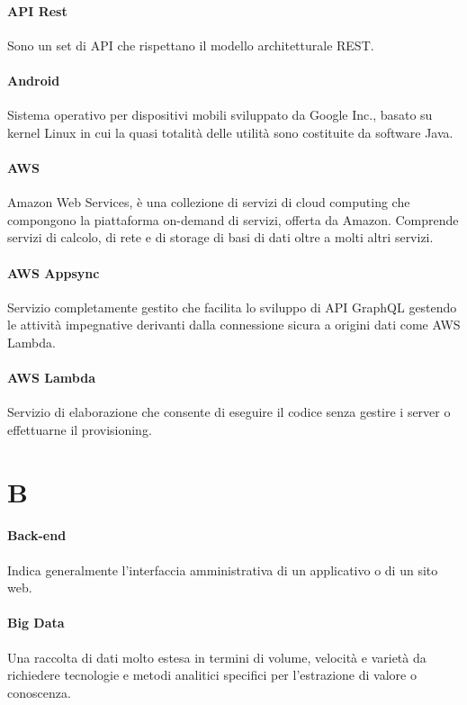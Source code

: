 \documentclass[]{article}
\begin{document}
	\paragraph*{API Rest}
	Sono un set di API che rispettano il modello architetturale REST.
	
	\paragraph*{Android}
	Sistema operativo per dispositivi mobili sviluppato da Google Inc., basato su kernel Linux in cui la quasi totalità delle utilità sono costituite da software Java.
		
	\paragraph*{AWS}
	Amazon Web Services, è una collezione di servizi di cloud computing che compongono la piattaforma on-demand di servizi, offerta da Amazon.	Comprende servizi di calcolo, di rete e di storage di basi di dati oltre a molti altri servizi.
	
	\paragraph*{AWS Appsync}
	Servizio completamente gestito che facilita lo sviluppo di API GraphQL gestendo le attività impegnative derivanti dalla connessione sicura a origini dati come AWS Lambda.
	
	\paragraph*{AWS Lambda}
	Servizio di elaborazione che consente di eseguire il codice senza gestire i server o effettuarne il provisioning.
	
	\newpage
	
	\section*{B}
	
	\paragraph*{Back-end}
	Indica generalmente l'interfaccia amministrativa di un applicativo o di un sito web.
	
	\paragraph*{Big Data}
	Una raccolta di dati molto estesa in termini di	volume, velocità e varietà da richiedere tecnologie e metodi analitici specifici per l'estrazione di valore o conoscenza.
	
\end{document}
